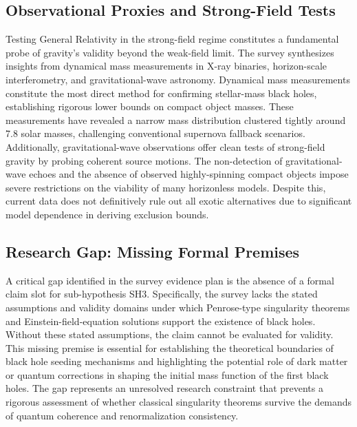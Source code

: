\documentclass[conference]{IEEEtran}
\begin{document}
\subsection{Observational Proxies and Strong-Field Tests}
Testing General Relativity in the strong-field regime constitutes a fundamental probe of gravity's validity beyond the weak-field limit. The survey synthesizes insights from dynamical mass measurements in X-ray binaries, horizon-scale interferometry, and gravitational-wave astronomy. Dynamical mass measurements constitute the most direct method for confirming stellar-mass black holes, establishing rigorous lower bounds on compact object masses. These measurements have revealed a narrow mass distribution clustered tightly around 7.8 solar masses, challenging conventional supernova fallback scenarios. Additionally, gravitational-wave observations offer clean tests of strong-field gravity by probing coherent source motions. The non-detection of gravitational-wave echoes and the absence of observed highly-spinning compact objects impose severe restrictions on the viability of many horizonless models. Despite this, current data does not definitively rule out all exotic alternatives due to significant model dependence in deriving exclusion bounds.

\subsection{Research Gap: Missing Formal Premises}
A critical gap identified in the survey evidence plan is the absence of a formal claim slot for sub-hypothesis SH3. Specifically, the survey lacks the stated assumptions and validity domains under which Penrose-type singularity theorems and Einstein-field-equation solutions support the existence of black holes. Without these stated assumptions, the claim cannot be evaluated for validity. This missing premise is essential for establishing the theoretical boundaries of black hole seeding mechanisms and highlighting the potential role of dark matter or quantum corrections in shaping the initial mass function of the first black holes. The gap represents an unresolved research constraint that prevents a rigorous assessment of whether classical singularity theorems survive the demands of quantum coherence and renormalization consistency.
\end{document}
